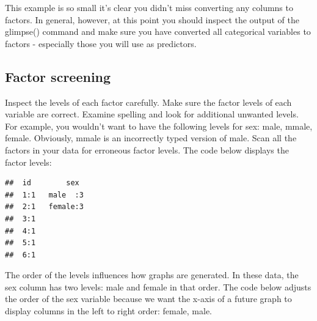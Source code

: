 \documentclass[
]{krantz}
\makeatletter
\newenvironment{Shaded}{\begin{snugshade}}{\end{snugshade}}
\newcommand{\DataTypeTok}[1]{\textcolor[rgb]{0.27,0.27,0.27}{#1}}
\newcommand{\KeywordTok}[1]{\textcolor[rgb]{0.27,0.27,0.27}{\textbf{#1}}}
\newcommand{\NormalTok}[1]{#1}
\newcommand{\OperatorTok}[1]{\textcolor[rgb]{0.43,0.43,0.43}{\textbf{#1}}}
\newcommand{\StringTok}[1]{\textcolor[rgb]{0.5,0.5,0.5}{#1}}
\newenvironment{kframe}{%
\medskip{}
\setlength{\fboxsep}{.8em}
 \def\at@end@of@kframe{}%
 \ifinner\ifhmode%
  \def\at@end@of@kframe{\end{minipage}}%
  \begin{minipage}{\columnwidth}%
 \fi\fi%
 \def\FrameCommand##1{\hskip\@totalleftmargin \hskip-\fboxsep
 \colorbox{shadecolor}{##1}\hskip-\fboxsep
     \hskip-\linewidth \hskip-\@totalleftmargin \hskip\columnwidth}%
 \MakeFramed {\advance\hsize-\width
   \@totalleftmargin\z@ \linewidth\hsize
   \@setminipage}}%
 {\par\unskip\endMakeFramed%
 \at@end@of@kframe}
\renewenvironment{Shaded}{\begin{kframe}}{\end{kframe}}
\makeatother
\begin{document}
This example is so small it's clear you didn't miss converting any columns to factors. In general, however, at this point you should inspect the output of the glimpse() command and make sure you have converted all categorical variables to factors - especially those you will use as predictors.

\hypertarget{factor-screening}{%
\subsection{Factor screening}\label{factor-screening}}

Inspect the levels of each factor carefully. Make sure the factor levels of each variable are correct. Examine spelling and look for additional unwanted levels. For example, you wouldn't want to have the following levels for sex: male, mmale, female. Obviously, mmale is an incorrectly typed version of male. Scan all the factors in your data for erroneous factor levels. The code below displays the factor levels:

\begin{Shaded}
\end{Shaded}

\begin{verbatim}
##  id        sex   
##  1:1   male  :3  
##  2:1   female:3  
##  3:1             
##  4:1             
##  5:1             
##  6:1
\end{verbatim}

The order of the levels influences how graphs are generated. In these data, the sex column has two levels: male and female in that order. The code below adjusts the order of the sex variable because we want the x-axis of a future graph to display columns in the left to right order: female, male.

\begin{Shaded}
\end{Shaded}
\end{document}
